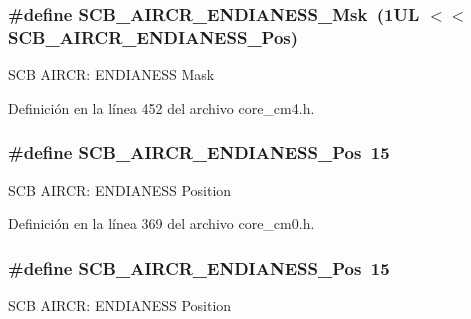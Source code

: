 \subsubsection[{\texorpdfstring{S\+C\+B\+\_\+\+A\+I\+R\+C\+R\+\_\+\+E\+N\+D\+I\+A\+N\+E\+S\+S\+\_\+\+Msk}{SCB_AIRCR_ENDIANESS_Msk}}]{\setlength{\rightskip}{0pt plus 5cm}\#define S\+C\+B\+\_\+\+A\+I\+R\+C\+R\+\_\+\+E\+N\+D\+I\+A\+N\+E\+S\+S\+\_\+\+Msk~(1\+U\+L $<$$<$ S\+C\+B\+\_\+\+A\+I\+R\+C\+R\+\_\+\+E\+N\+D\+I\+A\+N\+E\+S\+S\+\_\+\+Pos)}\hypertarget{group___c_m_s_i_s___s_c_b_ga2f571f93d3d4a6eac9a3040756d3d951}{}\label{group___c_m_s_i_s___s_c_b_ga2f571f93d3d4a6eac9a3040756d3d951}
S\+CB A\+I\+R\+CR\+: E\+N\+D\+I\+A\+N\+E\+SS Mask 

Definición en la línea 452 del archivo core\+\_\+cm4.\+h.

\subsubsection[{\texorpdfstring{S\+C\+B\+\_\+\+A\+I\+R\+C\+R\+\_\+\+E\+N\+D\+I\+A\+N\+E\+S\+S\+\_\+\+Pos}{SCB_AIRCR_ENDIANESS_Pos}}]{\setlength{\rightskip}{0pt plus 5cm}\#define S\+C\+B\+\_\+\+A\+I\+R\+C\+R\+\_\+\+E\+N\+D\+I\+A\+N\+E\+S\+S\+\_\+\+Pos~15}\hypertarget{group___c_m_s_i_s___s_c_b_gad31dec98fbc0d33ace63cb1f1a927923}{}\label{group___c_m_s_i_s___s_c_b_gad31dec98fbc0d33ace63cb1f1a927923}
S\+CB A\+I\+R\+CR\+: E\+N\+D\+I\+A\+N\+E\+SS Position 

Definición en la línea 369 del archivo core\+\_\+cm0.\+h.

\subsubsection[{\texorpdfstring{S\+C\+B\+\_\+\+A\+I\+R\+C\+R\+\_\+\+E\+N\+D\+I\+A\+N\+E\+S\+S\+\_\+\+Pos}{SCB_AIRCR_ENDIANESS_Pos}}]{\setlength{\rightskip}{0pt plus 5cm}\#define S\+C\+B\+\_\+\+A\+I\+R\+C\+R\+\_\+\+E\+N\+D\+I\+A\+N\+E\+S\+S\+\_\+\+Pos~15}\hypertarget{group___c_m_s_i_s___s_c_b_gad31dec98fbc0d33ace63cb1f1a927923}{}\label{group___c_m_s_i_s___s_c_b_gad31dec98fbc0d33ace63cb1f1a927923}
S\+CB A\+I\+R\+CR\+: E\+N\+D\+I\+A\+N\+E\+SS Position 

